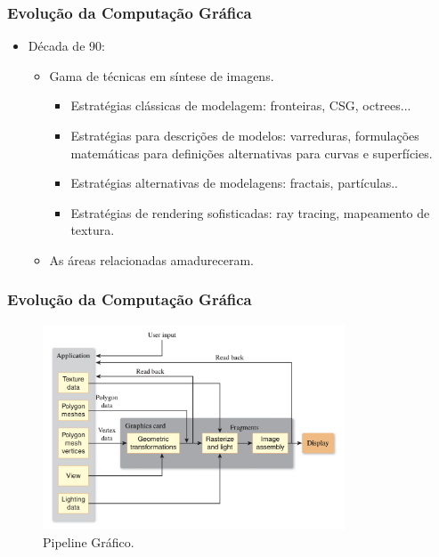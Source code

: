 \documentclass{beamer}
\begin{document}
\begin{frame}
\frametitle{Evolução da Computação Gráfica}

\begin{block}

	\begin{itemize}
		\item<1-> Década de 90:
		\begin{itemize}
			\item Gama de técnicas em síntese de imagens.
				\begin{itemize}
					\item Estratégias clássicas de modelagem: fronteiras, CSG, octrees...
					\item Estratégias para descrições de modelos: varreduras, formulações matemáticas para definições alternativas para curvas e superfícies.
					\item Estratégias alternativas de modelagens: fractais, partículas..
					\item Estratégias de rendering sofisticadas: ray tracing, mapeamento de textura. 
				\end{itemize}
			\item As áreas relacionadas amadureceram.
			
		\end{itemize}
	\end{itemize}
\end{block}

\end{frame}




\begin{frame}
\frametitle{Evolução da Computação Gráfica}

	\begin{figure}[!h]
		\begin{center}
			\includegraphics[width=0.8\textwidth]{Figures/graphicPipeline}
			\caption{Pipeline Gráfico.}
		\end{center}
		
	\end{figure}

\end{frame}
\end{document}
